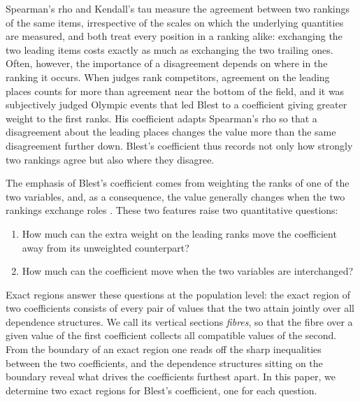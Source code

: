 \documentclass[11pt,a4paper]{article}
\theoremstyle{remark}
\newcommand{\1}{\mathbf{1}}
\begin{document}
Spearman's rho \cite{spearman1904proof} and Kendall's tau \cite{kendall1938new} measure the agreement between two rankings of the same items, irrespective of the scales on which the underlying quantities are measured, and both treat every position in a ranking alike: exchanging the two leading items costs exactly as much as exchanging the two trailing ones.
Often, however, the importance of a disagreement depends on where in the ranking it occurs.
When judges rank competitors, agreement on the leading places counts for more than agreement near the bottom of the field, and it was subjectively judged Olympic events that led Blest \cite{blest2000rank} to a coefficient giving greater weight to the first ranks.
His coefficient adapts Spearman's rho so that a disagreement about the leading places changes the value more than the same disagreement further down.
Blest's coefficient thus records not only how strongly two rankings agree but also where they disagree.

The emphasis of Blest's coefficient comes from weighting the ranks of one of the two variables, and, as a consequence, the value generally changes when the two rankings exchange roles \cite{genest2003blest}.
These two features raise two quantitative questions:
\begin{enumerate}[label=\textup{(Q\arabic*)},ref=(Q\arabic*),leftmargin=3.2em,topsep=0.8ex,itemsep=0.4ex,before=\itshape,after={\endgraf\vspace{0.6ex}\vspace{0pt}}]
\item\label{q:weighting} How much can the extra weight on the leading ranks move the coefficient away from its unweighted counterpart?
\item\label{q:transpose} How much can the coefficient move when the two variables are interchanged?
\end{enumerate}
Exact regions answer these questions at the population level: the exact region of two coefficients consists of every pair of values that the two attain jointly over all dependence structures.
We call its vertical sections \emph{fibres}, so that the fibre over a given value of the first coefficient collects all compatible values of the second.
From the boundary of an exact region one reads off the sharp inequalities between the two coefficients, and the dependence structures sitting on the boundary reveal what drives the coefficients furthest apart.
In this paper, we determine two exact regions for Blest's coefficient, one for each question.
\end{document}
